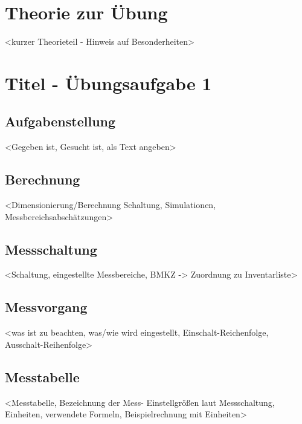 
\section{Theorie zur Übung}
	<kurzer Theorieteil - Hinweis auf Besonderheiten>
	

\section{Titel - Übungsaufgabe 1}

	\subsection{Aufgabenstellung}
		<Gegeben ist, Gesucht ist, als Text angeben>
		
	\subsection{Berechnung}
		<Dimensionierung/Berechnung Schaltung, Simulationen, Messbereichsabschätzungen>
		
	\subsection{Messschaltung}
		<Schaltung, eingestellte Messbereiche, BMKZ -> Zuordnung zu Inventarliste>
		
	\subsection{Messvorgang}
		<was ist zu beachten, was/wie wird eingestellt, Einschalt-Reichenfolge, Ausschalt-Reihenfolge>
		
	\subsection{Messtabelle}
		<Messtabelle, Bezeichnung der Mess- Einstellgrößen laut Messschaltung, Einheiten, verwendete Formeln, Beispielrechnung mit Einheiten>
		
